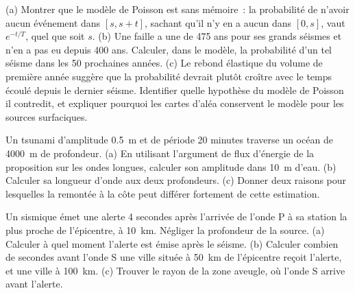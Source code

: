 \begin{exercise}[$\star\star\star$]\label{exo:b2:geological-hazards:10}
(a) Montrer que le modèle de Poisson est sans mémoire~: la probabilité de n'avoir aucun événement dans $[s, s + t]$,
sachant qu'il n'y en a aucun dans $[0, s]$, vaut $e^{-t/T}$, quel que soit $s$. (b) Une faille a une  de 475 ans pour ses grands séismes et n'en a pas eu depuis 400 ans. Calculer, dans le modèle, la probabilité
d'un tel séisme dans les 50 prochaines années. (c) Le rebond élastique du volume de première année suggère que la
probabilité devrait plutôt croître avec le temps écoulé depuis le dernier séisme. Identifier quelle hypothèse du modèle
de Poisson il contredit, et expliquer pourquoi les cartes d'aléa conservent le modèle pour les sources surfaciques.
\end{exercise}

\begin{exercise}[$\star\star\star$]\label{exo:b2:geological-hazards:11}
Un tsunami d'amplitude \qty{0.5}{m} et de période 20 minutes traverse un océan de \qty{4000}{m} de
profondeur. (a) En utilisant l'argument de flux d'énergie de la proposition sur les ondes longues,
calculer son amplitude dans \qty{10}{m} d'eau. (b) Calculer sa longueur d'onde aux deux profondeurs. (c)
Donner deux raisons pour lesquelles la remontée à la côte peut différer fortement de cette estimation.
\end{exercise}

\begin{exercise}[$\star\star\star$]\label{exo:b2:geological-hazards:12}
Un  sismique émet une alerte 4 secondes après l'arrivée de l'onde P à
sa station la plus proche de l'épicentre, à \qty{10}{km}. Négliger la profondeur de la source.
(a) Calculer à quel moment l'alerte est émise après le séisme. (b) Calculer combien de secondes
avant l'onde S une ville située à \qty{50}{km} de l'épicentre reçoit l'alerte, et une ville
à \qty{100}{km}. (c) Trouver le rayon de la zone aveugle, où l'onde S arrive avant l'alerte.
\end{exercise}

